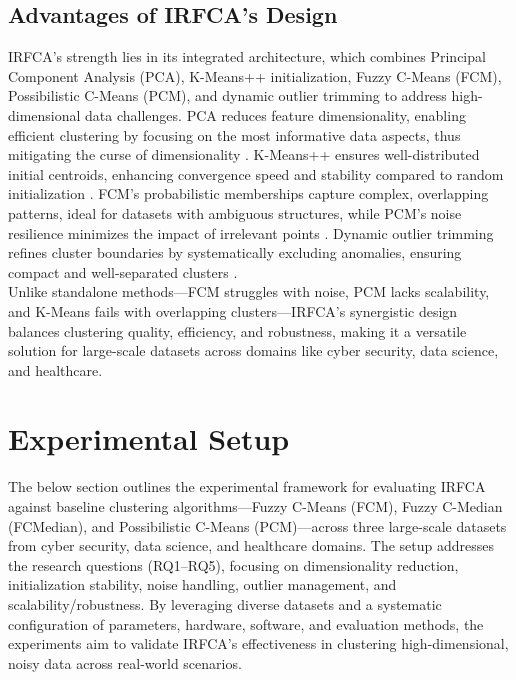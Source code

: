 \documentclass[twoside,11pt]{article}
\renewcommand{\cite}{\citep}
\begin{document}
\subsection{Advantages of IRFCA’s Design}
IRFCA’s strength lies in its integrated architecture, which combines Principal Component Analysis (PCA), K-Means++ initialization, Fuzzy C-Means (FCM), Possibilistic C-Means (PCM), and dynamic outlier trimming to address high-dimensional data challenges. PCA reduces feature dimensionality, enabling efficient clustering by focusing on the most informative data aspects, thus mitigating the curse of dimensionality \cite{zong2020}. K-Means++ ensures well-distributed initial centroids, enhancing convergence speed and stability compared to random initialization \cite{wang2019,cabrera2019}. FCM’s probabilistic memberships capture complex, overlapping patterns, ideal for datasets with ambiguous structures, while PCM’s noise resilience minimizes the impact of irrelevant points \cite{bezdek1984,yu2004,krishnapuram1993}. Dynamic outlier trimming refines cluster boundaries by systematically excluding anomalies, ensuring compact and well-separated clusters \cite{song2021,dorabiala2021}. \\
Unlike standalone methods—FCM struggles with noise, PCM lacks scalability, and K-Means fails with overlapping clusters—IRFCA’s synergistic design balances clustering quality, efficiency, and robustness, making it a versatile solution for large-scale datasets across domains like cyber security, data science, and healthcare.

\section{Experimental Setup}
The below section outlines the experimental framework for evaluating IRFCA against baseline clustering algorithms—Fuzzy C-Means (FCM), Fuzzy C-Median (FCMedian), and Possibilistic C-Means (PCM)—across three large-scale datasets from cyber security, data science, and healthcare domains. The setup addresses the research questions (RQ1–RQ5), focusing on dimensionality reduction, initialization stability, noise handling, outlier management, and scalability/robustness. By leveraging diverse datasets and a systematic configuration of parameters, hardware, software, and evaluation methods, the experiments aim to validate IRFCA’s effectiveness in clustering high-dimensional, noisy data across real-world scenarios.
\end{document}
